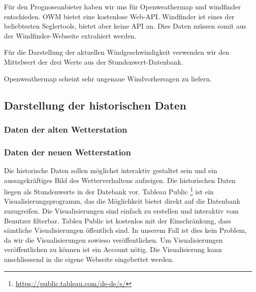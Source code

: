 Für den Prognoseanbieter haben wir uns für Openweathermap und windfinder entschieden. OWM bietet eine kostenlose Web-API. Windfinder ist eines der beliebtesten Seglertools, bietet aber keine API an. Dies Daten müssen somit aus der Windfinder-Webseite extrahiert werden.

Für die Darstellung der aktuellen Windgeschwindigkeit verwenden wir den Mittelwert der drei Werte aus der Stundenwert-Datenbank.

Openweathermap scheint sehr ungenaue Windvorhersagen zu liefern.

\newline












\subsection{Darstellung der historischen Daten}

\subsubsection{Daten der alten Wetterstation}
\newline
{}\newline
{}\newline

\subsubsection{Daten der neuen Wetterstation}
\newline
{}\newline

Die historische Daten sollen möglichst interaktiv gestaltet sein und ein aussagekräftiges Bild des Wetterverhaltens aufzeigen. Die historischen Daten liegen als Stundenwerte in der Datebank vor.
Tableau Public \footnote{ \url{https://public.tableau.com/de-de/s/}} ist ein Visualisierungsprogramm, das die Möglichkeit bietet direkt auf die Datenbank zuzugreifen. Die Visualisierungen sind einfach zu erstellen und interaktiv vom Benutzer filterbar.
Tableu Public ist kostenlos mit der Einschränkung, dass sämtliche Visualisierungen öffentlich sind. In unserem Fall ist dies kein Problem, da wir die Visualisierungen sowieso veröffentlichen. Um Visualisierungen veröffentlichen zu können ist ein Account nötig. Die Visualisierung kann anschliessend in die eigene Webseite eingebettet werden.

